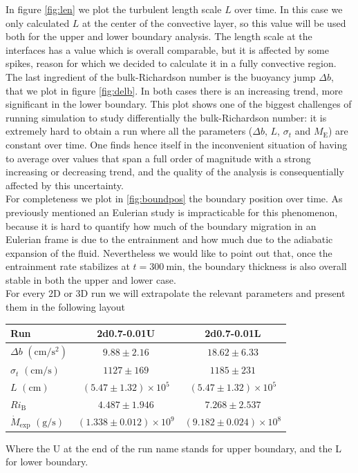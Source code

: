   In figure \ref{fig:len} we plot the turbulent length scale $L$ over time. In this case we only calculated $L$ at the center of the convective layer, so this value will be used both for the upper and lower boundary analysis. The length scale at the interfaces has a value which is overall comparable, but it is affected by some spikes, reason for which we decided to calculate it in a fully convective region.\\ 
  The last ingredient of the bulk-Richardson number is the buoyancy jump $\Delta b$, that we plot in figure \ref{fig:delb}. In both cases there is an increasing trend, more significant in the lower boundary. This plot shows one of the biggest challenges of running simulation to study differentially the bulk-Richardson number: it is extremely hard to obtain a run where all the parameters ($\Delta b$, $L$, $\sigma_t$ and $M_{\mathrm{E}}$) are constant over time. One finds hence itself in the inconvenient situation of having to average over values that span a full order of magnitude with a strong increasing or decreasing trend, and the quality of the analysis is consequentially affected by this uncertainty.\\
For completeness we plot in \ref{fig:boundpos} the boundary position over time. As previously mentioned an Eulerian study is impracticable for this phenomenon, because it is hard to quantify how much of the boundary migration in an Eulerian frame is due to the entrainment and how much due to the adiabatic expansion of the fluid. Nevertheless we would like to point out that, once the entrainment rate stabilizes at $t=300 \ \mathrm{min}$, the boundary thickness is also overall stable in both the upper and lower case. \\
For every 2D or 3D run we will extrapolate the relevant parameters and present them in the following layout
\begin{center}
 \begin{tabular}{l|c|c}
	 Run &2d0.7-0.01U&2d0.7-0.01L\\
	  	\hline
	   $\Delta b$ $(\mathrm{cm/s^{2}})$&$ 9.88 \pm 2.16 $&$18.62 \pm 6.33$\\
		\hline
	   $\sigma_t$ $(\mathrm{cm/s})$ &$ 1127 \pm 169 $&$1185 \pm 231$\\
		\hline
	   $L$ $(\mathrm{cm})$&$(5.47 \pm 1.32) \times 10^5$&$(5.47 \pm 1.32) \times 10^5$\\
		\hline
	   $Ri_{\mathrm{B}}$& $4.487 \pm 1.946 $&$7.268 \pm 2.537$\\
		\hline
	   $\dot{M}_{\mathrm{exp}}$ $(\mathrm{g/s})$ &$(1.338 \pm 0.012) \times 10^9$&$(9.182 \pm 0.024) \times 10^8$\\
      \end{tabular}
 \end{center}
 Where the U at the end of the run name stands for upper boundary, and the L for lower boundary.


